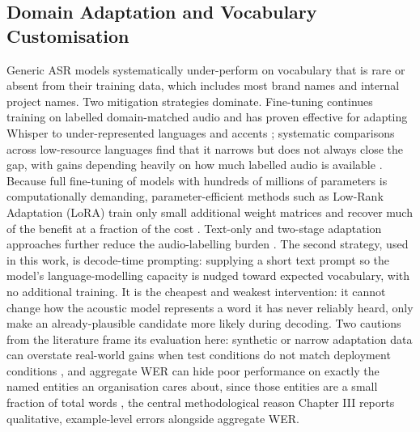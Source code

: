 \documentclass[12pt]{report}
\begin{document}
\subsection{Domain Adaptation and Vocabulary Customisation}
Generic ASR models systematically under-perform on vocabulary that is rare or absent from their training data, which includes most brand names and internal project names. Two mitigation strategies dominate. Fine-tuning continues training on labelled domain-matched audio and has proven effective for adapting Whisper to under-represented languages and accents \cite{daouad2024optimizing,polat2024implementation}; systematic comparisons across low-resource languages find that it narrows but does not always close the gap, with gains depending heavily on how much labelled audio is available \cite{whisperfinetune2024}. Because full fine-tuning of models with hundreds of millions of parameters is computationally demanding, parameter-efficient methods such as Low-Rank Adaptation (LoRA) train only small additional weight matrices and recover much of the benefit at a fraction of the cost \cite{ankita2026exploring}. Text-only and two-stage adaptation approaches further reduce the audio-labelling burden \cite{fang2025textonly,zheng2026twostage}. The second strategy, used in this work, is decode-time prompting: supplying a short text prompt so the model's language-modelling capacity is nudged toward expected vocabulary, with no additional training. It is the cheapest and weakest intervention: it cannot change how the acoustic model represents a word it has never reliably heard, only make an already-plausible candidate more likely during decoding. Two cautions from the literature frame its evaluation here: synthetic or narrow adaptation data can overstate real-world gains when test conditions do not match deployment conditions \cite{tran2025das}, and aggregate WER can hide poor performance on exactly the named entities an organisation cares about, since those entities are a small fraction of total words \cite{durmus2026contextual}, the central methodological reason Chapter III reports qualitative, example-level errors alongside aggregate WER.
\end{document}
